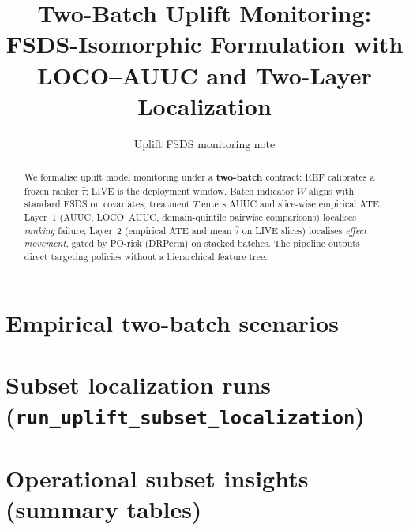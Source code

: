 \documentclass[11pt]{article}
\title{Two-Batch Uplift Monitoring:\\
FSDS-Isomorphic Formulation with LOCO--AUUC and Two-Layer Localization}
\author{Uplift FSDS monitoring note}
\date{}
\begin{document}
\maketitle

\begin{abstract}
We formalise uplift model monitoring under a \textbf{two-batch} contract:
REF calibrates a frozen ranker $\hat\tau$; LIVE is the deployment window.
Batch indicator $W$ aligns with standard FSDS on covariates; treatment $T$ enters AUUC and slice-wise empirical ATE.
Layer~1 (AUUC, LOCO--AUUC, domain-quintile pairwise comparisons) localises \emph{ranking} failure;
Layer~2 (empirical ATE and mean $\hat\tau$ on LIVE slices) localises \emph{effect movement}, gated by PO-risk (DRPerm) on stacked batches.
The pipeline outputs direct targeting policies without a hierarchical feature tree.
\end{abstract}



\section{Empirical two-batch scenarios}


\section{Subset localization runs (\texttt{run\_uplift\_subset\_localization})}


\section{Operational subset insights (summary tables)}

\end{document}

